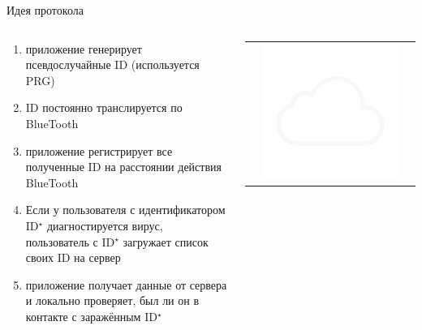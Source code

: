 \documentclass[usenames,dvipsnames,8pt,aspectratio=169]{beamer}
\begin{document}
\begin{frame}{Идея протокола}
	\large
	\begin{columns}[T]
		\begin{column}{0.5\textwidth}
			\begin{enumerate}
				\item приложение генерирует псевдослучайные ID (используется PRG)
				\item  ID постоянно транслируется по BlueTooth
				\item приложение регистрирует все полученные ID на расстоянии действия BlueTooth
				\item Если у пользователя с идентификатором ID$^\star$ диагностируется вирус, пользователь с  ID$^\star$ загружает список своих ID на сервер
				\item  приложение получает данные от сервера  и локально проверяет, был ли он в контакте с заражённым ID$^\star$ 
			\end{enumerate}
		\end{column}
	\begin{column}{0.5\textwidth}
		\vspace{-4em}
		\begin{tabular}{c c c}
			&\includegraphics[scale=0.15]{remote_cloud} &  \\[-30pt]

\end{tabular}
\end{column}
\end{columns}
\end{frame}
\end{document}

